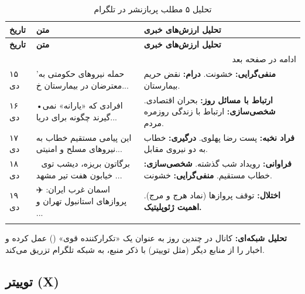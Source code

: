 \documentclass{article}
\begin{document}
	\begin{longtable}[c]{|p{1.5cm}|p{5cm}|p{7cm}|}
		\hline
		\textbf{تاریخ} & \textbf{متن} & \textbf{تحلیل ارزش‌های خبری} \\
		\hline
		\endfirsthead
		
		\hline
		\textbf{تاریخ} & \textbf{متن} & \textbf{تحلیل ارزش‌های خبری} \\
		\hline
		\endhead
		
		\hline \multicolumn{3}{r}{{ادامه در صفحه بعد}} \\
		\endfoot
		
		\hline
		\endlastfoot
		
		۱۵ دی & 'حمله نیروهای حکومتی به معترضان در بیمارستان خ... & \textbf{منفی‌گرایی:} خشونت. \textbf{درام:} نقض حریم بیمارستان. \\
		\hline
		۱۶ دی & •️افرادی که «یارانه» نمی گیرند چگونه برای دریا... & \textbf{ارتباط با مسائل روز:} بحران اقتصادی. \textbf{شخصی‌سازی:} ارتباط با زندگی روزمره مردم. \\
		\hline
		۱۷ دی & این پیامی مستقیم خطاب به نیروهای مسلح و امنیتی... & \textbf{فراد نخبه:} پست رضا پهلوی. \textbf{درگیری:} خطاب به دو نیروی مقابل. \\
		\hline
		۱۸ دی & 🔴 برگاتون بریزه، دیشب توی خیابون هفت تیر مشهد ... & \textbf{فراوانی:} رویداد شب گذشته. \textbf{شخصی‌سازی:} خطاب مستقیم. \textbf{منفی‌گرایی:} خشونت. \\
		\hline
		۱۹ دی & ✈️ اسمان غرب ایران: پروازهای استانبول تهران و ... & \textbf{اختلال:} توقف پروازها (نماد هرج و مرج). \textbf{اهمیت ژئوپلیتیک.} \\
		\hline
		\caption{تحلیل ۵ مطلب پربازنشر در تلگرام}
	\end{longtable}
	
	\textbf{تحلیل شبکه‌ای:} کانال  در چندین روز به عنوان یک «تکرارکننده قوی» () عمل کرده و اخبار را از منابع دیگر (مثل توییتر) با ذکر منبع، به شبکه تلگرام تزریق می‌کند.
	
	\subsection{توییتر (X)}
	
\end{document}

